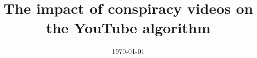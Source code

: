 \documentclass{uva-inf-article}
\title{The impact of conspiracy videos on the YouTube algorithm}
\date{\today}
\begin{document}
\maketitle

\begin{abstract}
    \lipsum[25]
\end{abstract}

\linenumbers











\newpage



\newpage
\nolinenumbers

 

\newpage


\end{document}
